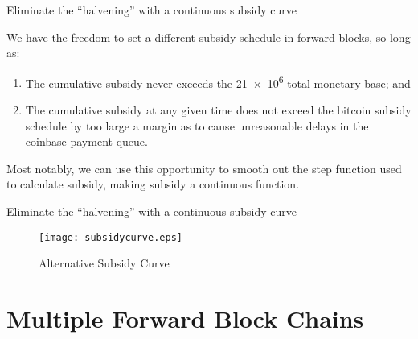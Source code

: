 \documentclass[10pt]{beamer}
\begin{document}
\begin{frame}{Eliminate the ``halvening'' with a continuous subsidy curve}

  We have the freedom to set a different subsidy schedule in forward
  blocks, so long as:

  \begin{enumerate}

  \item The cumulative subsidy never exceeds the \SI{21e6}{\bitcoin}
    total monetary base; and

  \item The cumulative subsidy at any given time does not exceed the
    bitcoin subsidy schedule by too large a margin as to cause
    unreasonable delays in the coinbase payment queue.

  \end{enumerate}

  Most notably, we can use this opportunity to smooth out the step
  function used to calculate subsidy, making subsidy a continuous
  function.

\end{frame}

\begin{frame}{Eliminate the ``halvening'' with a continuous subsidy curve}

  \begin{figure}
    \centering
    \texttt{[image: subsidycurve.eps]}
    \caption{Alternative Subsidy Curve}
    \label{subsidycurve}
  \end{figure}

\end{frame}

\section{Multiple Forward Block Chains}
\end{document}
